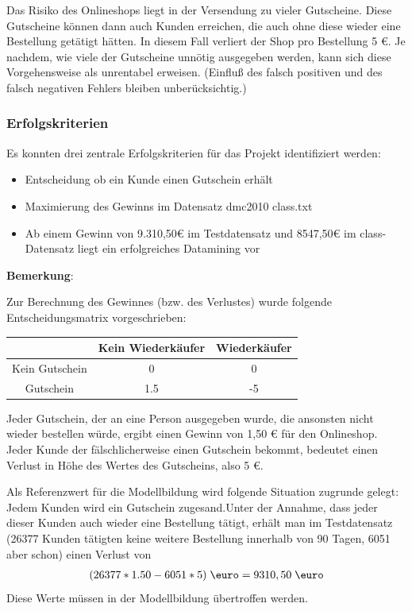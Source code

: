 \documentclass[a4paper,12pt]{article}
\begin{document}
Das Risiko des Onlineshops liegt in der Versendung zu vieler Gutscheine. Diese Gutscheine können dann auch Kunden erreichen, die auch ohne diese wieder eine Bestellung getätigt hätten. In diesem Fall verliert der Shop pro Bestellung 5 \euro. Je nachdem, wie viele der Gutscheine unnötig ausgegeben werden, kann
sich diese Vorgehensweise als unrentabel erweisen. (Einfluß des falsch positiven und des falsch negativen Fehlers bleiben unberücksichtig.)

\subsubsection{Erfolgskriterien}
Es konnten drei zentrale Erfolgskriterien für das Projekt identifiziert werden:
\begin{itemize}
	\item Entscheidung ob ein Kunde einen Gutschein erhält
	\item Maximierung des Gewinns im Datensatz dmc2010 class.txt
	\item Ab einem Gewinn von 9.310,50\euro\; im Testdatensatz und 8547,50\euro\; im class-Datensatz liegt ein erfolgreiches Datamining vor
\end{itemize}

\textbf{Bemerkung}:
\par
Zur Berechnung des Gewinnes (bzw. des Verlustes) wurde folgende Entscheidungsmatrix vorgeschrieben:
\begin{center}
\begin{tabular}{|c | c | c |}
\hline
 & Kein Wiederkäufer & Wiederkäufer
\\
\hline
Kein Gutschein & 0 & 0
\\
\hline
Gutschein & 1.5 & -5
\\
\hline
\end{tabular}
\end{center}
Jeder Gutschein, der an eine Person ausgegeben wurde, die ansonsten nicht wieder bestellen
würde, ergibt einen Gewinn von 1,50 \euro\; für den Onlineshop. Jeder Kunde der fälschlicherweise
einen Gutschein bekommt, bedeutet einen Verlust in  Höhe des Wertes des Gutscheins, also 5 \euro.

Als Referenzwert\label{Referenzwerte} für die Modellbildung wird folgende Situation
zugrunde gelegt: Jedem Kunden wird ein Gutschein zugesand.Unter der Annahme, dass jeder dieser Kunden auch wieder eine Bestellung tätigt, erhält man im Testdatensatz (26377 Kunden tätigten keine weitere Bestellung innerhalb von 90 Tagen, 6051 aber schon) einen Verlust von
\begin{align*}
(26377 *1.50 - 6051*5)\;\text{\euro} = 9310,50\;\text{\euro}
\end{align*}
Diese Werte müssen in der Modellbildung übertroffen werden.
\end{document}
